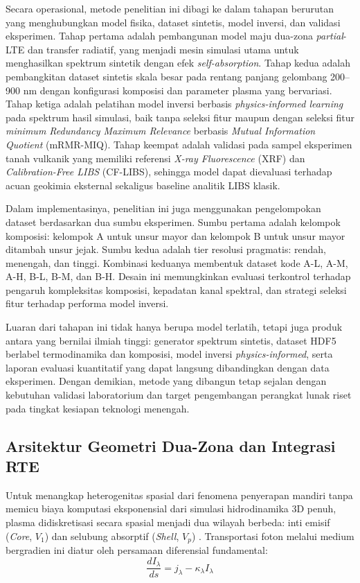\documentclass[10pt,leqno]{amsart}
\begin{document}
Secara operasional, metode penelitian ini dibagi ke dalam tahapan berurutan yang menghubungkan model fisika, dataset sintetis, model inversi, dan validasi eksperimen. Tahap pertama adalah pembangunan model maju dua-zona \textit{partial}-LTE dan transfer radiatif, yang menjadi mesin simulasi utama untuk menghasilkan spektrum sintetik dengan efek \textit{self-absorption}. Tahap kedua adalah pembangkitan dataset sintetis skala besar pada rentang panjang gelombang 200--900 nm dengan konfigurasi komposisi dan parameter plasma yang bervariasi. Tahap ketiga adalah pelatihan model inversi berbasis \textit{physics-informed learning} pada spektrum hasil simulasi, baik tanpa seleksi fitur maupun dengan seleksi fitur \textit{minimum Redundancy Maximum Relevance} berbasis \textit{Mutual Information Quotient} (mRMR-MIQ). Tahap keempat adalah validasi pada sampel eksperimen tanah vulkanik yang memiliki referensi \textit{X-ray Fluorescence} (XRF) dan \textit{Calibration-Free LIBS} (CF-LIBS), sehingga model dapat dievaluasi terhadap acuan geokimia eksternal sekaligus baseline analitik LIBS klasik.

Dalam implementasinya, penelitian ini juga menggunakan pengelompokan dataset berdasarkan dua sumbu eksperimen. Sumbu pertama adalah kelompok komposisi: kelompok A untuk unsur mayor dan kelompok B untuk unsur mayor ditambah unsur jejak. Sumbu kedua adalah tier resolusi pragmatis: rendah, menengah, dan tinggi. Kombinasi keduanya membentuk dataset kode A-L, A-M, A-H, B-L, B-M, dan B-H. Desain ini memungkinkan evaluasi terkontrol terhadap pengaruh kompleksitas komposisi, kepadatan kanal spektral, dan strategi seleksi fitur terhadap performa model inversi.

Luaran dari tahapan ini tidak hanya berupa model terlatih, tetapi juga produk antara yang bernilai ilmiah tinggi: generator spektrum sintetis, dataset HDF5 berlabel termodinamika dan komposisi, model inversi \textit{physics-informed}, serta laporan evaluasi kuantitatif yang dapat langsung dibandingkan dengan data eksperimen. Dengan demikian, metode yang dibangun tetap sejalan dengan kebutuhan validasi laboratorium dan target pengembangan perangkat lunak riset pada tingkat kesiapan teknologi menengah.

\subsection{Arsitektur Geometri Dua-Zona dan Integrasi RTE} \label{sec:rte}

Untuk menangkap heterogenitas spasial dari fenomena penyerapan mandiri tanpa memicu biaya komputasi eksponensial dari simulasi hidrodinamika 3D penuh, plasma didiskretisasi secara spasial menjadi dua wilayah berbeda: inti emisif (\textit{Core}, $V_1$) dan selubung absorptif (\textit{Shell}, $V_p$) \cite{zaitsev_two-zone_2024,hansen_modeling_2021}. Transportasi foton melalui medium bergradien ini diatur oleh persamaan diferensial fundamental:
\begin{equation} \label{eq:rte_general}
\frac{dI_\lambda}{ds} = j_\lambda - \kappa_\lambda I_\lambda
\end{equation}
\end{document}
